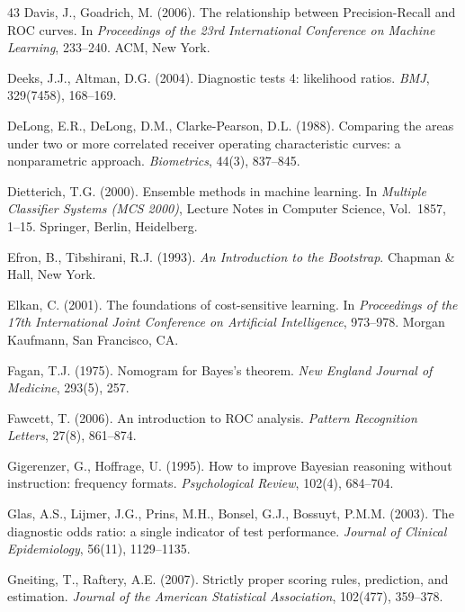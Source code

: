 \documentclass[11pt]{article}
\begin{document}
\begin{thebibliography}{43}
Davis, J., Goadrich, M. (2006).
The relationship between Precision-Recall and ROC curves.
In \textit{Proceedings of the 23rd International Conference on Machine
Learning}, 233--240. ACM, New York.

Deeks, J.J., Altman, D.G. (2004).
Diagnostic tests 4: likelihood ratios.
\textit{BMJ}, 329(7458), 168--169.

DeLong, E.R., DeLong, D.M., Clarke-Pearson, D.L. (1988).
Comparing the areas under two or more correlated receiver operating
characteristic curves: a nonparametric approach.
\textit{Biometrics}, 44(3), 837--845.

Dietterich, T.G. (2000).
Ensemble methods in machine learning.
In \textit{Multiple Classifier Systems (MCS 2000)}, Lecture Notes in
Computer Science, Vol.\ 1857, 1--15. Springer, Berlin, Heidelberg.

Efron, B., Tibshirani, R.J. (1993).
\textit{An Introduction to the Bootstrap}.
Chapman \& Hall, New York.

Elkan, C. (2001).
The foundations of cost-sensitive learning.
In \textit{Proceedings of the 17th International Joint Conference on
Artificial Intelligence}, 973--978. Morgan Kaufmann, San Francisco, CA.

Fagan, T.J. (1975).
Nomogram for Bayes's theorem.
\textit{New England Journal of Medicine}, 293(5), 257.

Fawcett, T. (2006).
An introduction to ROC analysis.
\textit{Pattern Recognition Letters}, 27(8), 861--874.

Gigerenzer, G., Hoffrage, U. (1995).
How to improve Bayesian reasoning without instruction: frequency formats.
\textit{Psychological Review}, 102(4), 684--704.

Glas, A.S., Lijmer, J.G., Prins, M.H., Bonsel, G.J., Bossuyt, P.M.M. (2003).
The diagnostic odds ratio: a single indicator of test performance.
\textit{Journal of Clinical Epidemiology}, 56(11), 1129--1135.

Gneiting, T., Raftery, A.E. (2007).
Strictly proper scoring rules, prediction, and estimation.
\textit{Journal of the American Statistical Association}, 102(477),
359--378.


\end{thebibliography}
\end{document}
